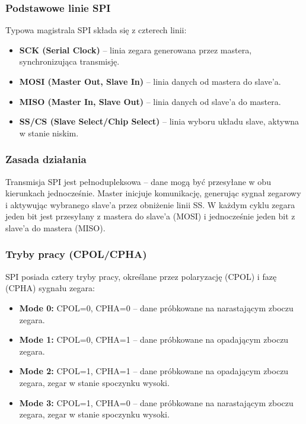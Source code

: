 \documentclass[a4paper,12pt]{report}
\begin{document}
\subsubsection*{Podstawowe linie SPI}

Typowa magistrala SPI składa się z czterech linii:
\begin{itemize}
    \item \textbf{SCK (Serial Clock)} – linia zegara generowana przez mastera, synchronizująca transmisję.
    \item \textbf{MOSI (Master Out, Slave In)} – linia danych od mastera do slave'a.
    \item \textbf{MISO (Master In, Slave Out)} – linia danych od slave'a do mastera.
    \item \textbf{SS/CS (Slave Select/Chip Select)} – linia wyboru układu slave, aktywna w stanie niskim.
\end{itemize}

\subsubsection*{Zasada działania}

Transmisja SPI jest pełnodupleksowa – dane mogą być przesyłane w obu kierunkach jednocześnie. Master inicjuje komunikację, generując sygnał zegarowy i aktywując wybranego slave'a przez obniżenie linii SS. W każdym cyklu zegara jeden bit jest przesyłany z mastera do slave'a (MOSI) i jednocześnie jeden bit z slave'a do mastera (MISO).

\subsubsection*{Tryby pracy (CPOL/CPHA)}

SPI posiada cztery tryby pracy, określane przez polaryzację (CPOL) i fazę (CPHA) sygnału zegara:
\begin{itemize}
    \item \textbf{Mode 0:} CPOL=0, CPHA=0 – dane próbkowane na narastającym zboczu zegara.
    \item \textbf{Mode 1:} CPOL=0, CPHA=1 – dane próbkowane na opadającym zboczu zegara.
    \item \textbf{Mode 2:} CPOL=1, CPHA=1 – dane próbkowane na opadającym zboczu zegara, zegar w stanie spoczynku wysoki.
    \item \textbf{Mode 3:} CPOL=1, CPHA=0 – dane próbkowane na narastającym zboczu zegara, zegar w stanie spoczynku wysoki.
\end{itemize}
\end{document}
